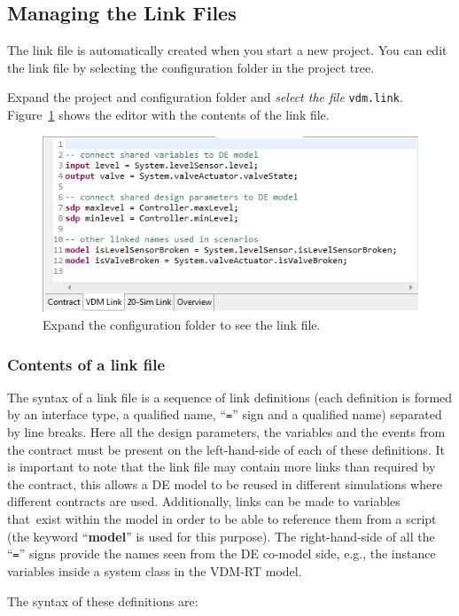 \documentclass{crescendorepchap}
\newcommand{\vdmkeyw}[1]{{\bf\ttfamily #1}}
\begin{document}
\subsection{Managing the Link Files}

The link file is automatically created when you start a new project. You
can edit the link file by selecting the configuration folder in the
project tree.

Expand the project and configuration folder and \emph{select the file} \texttt{vdm.link}. Figure~\ref{fig:linkfile} shows the editor with the contents of the link file.


\begin{figure}[htbp]
\centering
\includegraphics[width=.6\textwidth]{images/DestecsContractFile.png}
\caption{Expand the configuration folder to see the link file.\label{fig:linkfile}}
\end{figure}



\subsubsection{Contents of a link file}

The syntax of a link file is a sequence of link definitions (each
definition is formed by an interface type, a qualified name, ``\texttt{=}'' sign
and a qualified name) separated by line breaks. Here all the design
parameters, the variables and the events from the contract must be
present on the left-hand-side of each of these definitions. It is
important to note that the link file may contain more links than
required by the contract, this allows a DE model to be reused in
different simulations where different contracts are used. Additionally,
links can be made to variables that~exist within the model in order to
be able to reference them from a script (the keyword ``\vdmkeyw{model}'' is used
for this purpose). The right-hand-side of all the ``\texttt{=}'' signs provide
the names seen from the DE co-model side, e.g., the instance variables
inside a system class in the VDM-RT model.

The syntax of these definitions are:
\end{document}

